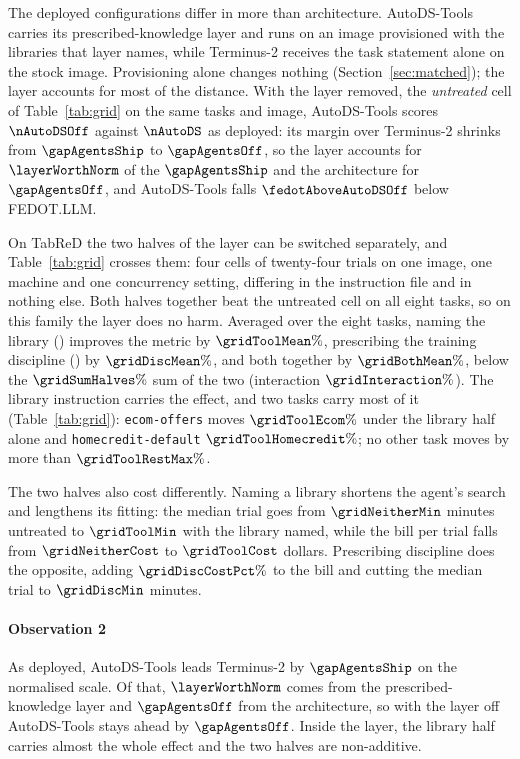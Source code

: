 The deployed configurations differ in more than architecture. AutoDS-Tools
carries its prescribed-knowledge layer and runs on an image provisioned with
the libraries that layer names, while Terminus-2 receives the task statement
alone on the stock image. Provisioning alone changes nothing
(Section~\ref{sec:matched}); the layer accounts for most of the distance.
With the layer removed, the \emph{untreated} cell of Table~\ref{tab:grid} on
the same tasks and image, AutoDS-Tools scores $\nAutoDSOff$ against
$\nAutoDS$ as deployed: its margin over Terminus-2 shrinks from
$\gapAgentsShip$ to $\gapAgentsOff$, so the layer accounts for
$\layerWorthNorm$ of the $\gapAgentsShip$ and the architecture for
$\gapAgentsOff$, and AutoDS-Tools falls $\fedotAboveAutoDSOff$ below
FEDOT.LLM.



On TabReD the two halves of the layer can be switched separately, and
Table~\ref{tab:grid} crosses them: four cells of twenty-four trials on one
image, one machine and one concurrency setting, differing in the instruction
file and in nothing else. Both halves together beat the untreated cell on all
eight tasks, so on this family the layer does no harm. Averaged over the eight tasks, naming the library (\Ktool{}) improves the
metric by $\gridToolMean\%$, prescribing the training discipline (\Kdisc{}) by
$\gridDiscMean\%$, and both together by $\gridBothMean\%$, below the
$\gridSumHalves\%$ sum of the two (interaction $\gridInteraction\%$). The
library instruction carries the effect, and two tasks carry most of it
(Table~\ref{tab:grid}): \texttt{ecom-offers} moves $\gridToolEcom\%$ under
the library half alone and \texttt{homecredit-default}
$\gridToolHomecredit\%$; no other task moves by more than
$\gridToolRestMax\%$.

The two halves also cost differently. Naming a library shortens the agent's
search and lengthens its fitting: the median trial goes from $\gridNeitherMin$
minutes untreated to $\gridToolMin$ with the library named, while the bill per
trial falls from $\gridNeitherCost$ to $\gridToolCost$ dollars. Prescribing
discipline does the opposite, adding $\gridDiscCostPct\%$ to the bill and
cutting the median trial to $\gridDiscMin$ minutes.

\paragraph{Observation 2} As deployed, AutoDS-Tools leads Terminus-2 by
$\gapAgentsShip$ on the normalised scale. Of that, $\layerWorthNorm$ comes from
the prescribed-knowledge layer and $\gapAgentsOff$ from the architecture, so with
the layer off AutoDS-Tools stays ahead by $\gapAgentsOff$. Inside the layer, the library half carries almost the whole
effect and the two halves are non-additive.

